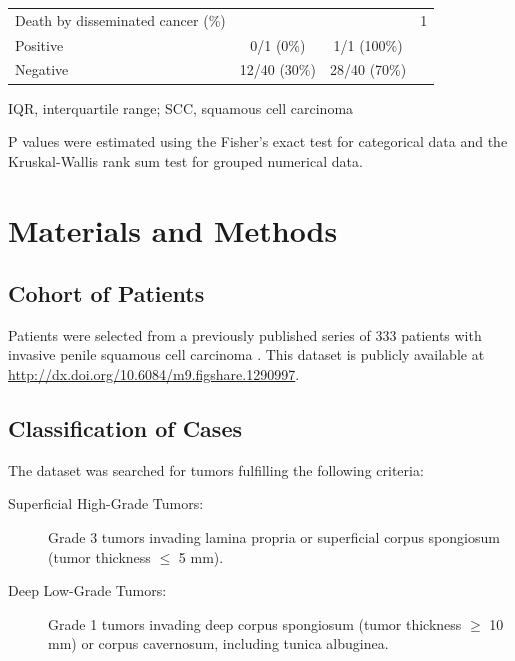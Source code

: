 \documentclass[11pt,letterpaper]{article}\usepackage[]{graphicx}\usepackage[]{color}
\begin{document}
\begin{multicols}{2}
\begin{table}
\begin{tabular}{lccl}
\hspace{2ex} Death by disseminated cancer (\%) & ~ & ~ & 1 \\
\hspace{4ex} Positive
        & 0/1 (0\%)
        & 1/1 (100\%)
        & ~ \\
\hspace{4ex} Negative
        & 12/40 (30\%)
        & 28/40 (70\%)
        & ~ \\
\hline
\end{tabular}
\begin{tablenotes}
\small
\item IQR, interquartile range; SCC, squamous cell carcinoma
\item P values were estimated using the Fisher’s exact test for categorical data and the Kruskal-Wallis rank sum test for grouped numerical data.
\end{tablenotes}

\end{table}


\section*{Materials and Methods}

\subsection*{Cohort of Patients}
Patients were selected from a previously published series of 333 patients with invasive penile squamous cell carcinoma \cite{Guimaraes2009}. This dataset is publicly available at \url{http://dx.doi.org/10.6084/m9.figshare.1290997}.

\subsection*{Classification of Cases}
The dataset was searched for tumors fulfilling the following criteria:

\begin{description}
        \item[Superficial High-Grade Tumors:] Grade 3 tumors invading lamina propria or superficial corpus spongiosum (tumor thickness $\leq$ 5 mm).
        \item[Deep Low-Grade Tumors:] Grade 1 tumors invading deep corpus spongiosum (tumor thickness $\geq$ 10 mm) or corpus cavernosum, including tunica albuginea.
\end{description}


\end{multicols}
\end{document}
